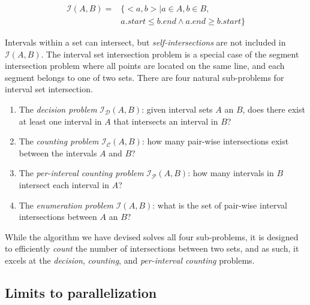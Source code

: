 \documentclass{bioinfo}
\begin{document}
        \begin{equation*}
                \begin{split}
                        \mathcal{I}(A,B)= &\{ <a,b> | a \in A, b \in B, \\
                        & a.start \leq b.end \wedge a.end \geq b.start\}
                \end{split}
        \end{equation*}

        Intervals within a set can intersect, but {\em self-intersections} are
        not included in $\mathcal{I}(A,B)$.  The interval set intersection 
        problem is a special case of the segment intersection problem where 
        all points are located on the same line, and each segment belongs to 
        one of two sets. There are four natural sub-problems for interval set 
        intersection.
        \begin{enumerate}
                \item The {\em decision problem} $\mathcal{I_D}(A,B)$:  given interval sets $A$
                an $B$, does there exist at least one interval in $A$ that intersects an interval in
                $B$?
                \item The {\em counting problem} $\mathcal{I_C}(A,B)$: how many pair-wise
                intersections exist between the intervals $A$ and $B$?
                \item The {\em per-interval counting problem} $\mathcal{I_P}(A,B)$: how many
                intervals in $B$ intersect each interval in $A$?
                \item The {\em enumeration problem} $\mathcal{I}(A,B)$: what is the set of
                pair-wise interval intersections between $A$ an $B$?
        \end{enumerate}
        
        While the algorithm we have devised solves all four sub-problems, it is
        designed to efficiently \emph{count} the number of intersections between
        two sets, and as such, it excels at the \emph{decision}, \emph{counting},
        and \emph{per-interval counting} problems.


        \subsection{Limits to parallelization}
\end{document}
